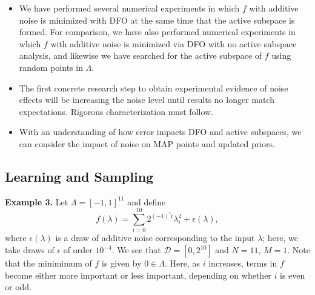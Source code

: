 \documentclass[11pt]{beamer}
\begin{document}
\begin{frame}

\begin{itemize}

	\item We have performed several numerical experiments in which $f$ with additive noise is minimized with DFO at the same time that the active subspace is formed. For comparison, we have also performed numerical experiments in which $f$ with additive noise is minimized via DFO with no active subspace analysis, and likewise we have searched for the active subspace of $f$ using random points in $\Lambda$.
	


	\item The first concrete research step to obtain experimental evidence of noise effects will be increasing the noise level until results no longer match expectations. Rigorous characterization must follow.
	
	\item With an understanding of how error impacts DFO and active subspaces, we can consider the impact of noise on MAP points and updated priors.


\end{itemize}

\end{frame}

\subsection{Learning and Sampling}

\begin{frame}

 \textbf{Example 3.} Let $\Lambda=[-1,1]^{11}$ and define $$f(\lambda)=\sum_{i=0}^{10} 2^{(-1)^i i}\lambda_i^2+\epsilon(\lambda),$$ where $\epsilon(\lambda)$ is a draw of additive noise corresponding to the input $\lambda$; here, we take draws of $\epsilon$ of order $10^{-4}$. We see that $\mathcal{D}=[0,2^{10}]$ and $N=11$, $M=1$. Note that the minimimum of $f$ is given by $0 \in \Lambda$. Here, as $i$ increases, terms in $f$ become either more important or less important, depending on whether $i$ is even or odd.


\end{frame}
\end{document}
